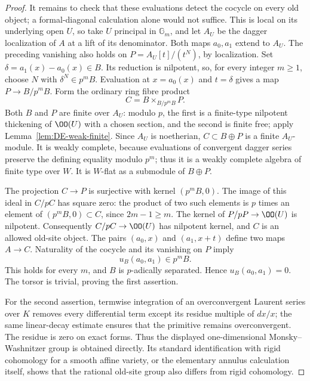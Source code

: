 \begin{proof}
It remains to check that these evaluations detect the cocycle on every old object; a formal-diagonal calculation alone would not suffice.  This is local on its underlying open $U$, so take $U$ principal in $\mathbb G_m$, and let $A_U$ be the dagger localization of $A$ at a lift of its denominator.  Both maps $a_0,a_1$ extend to $A_U$.  The preceding vanishing also holds on
$P=A_U[t]/(t^N)$, by localization.  Set $\delta=a_1(x)-a_0(x)\in B$.  Its reduction is nilpotent, so, for every integer $m\geq1$, choose $N$ with $\delta^N\in p^mB$.  Evaluation at $x=a_0(x)$ and $t=\delta$ gives a map $P\to B/p^mB$.  Form the ordinary ring fibre product
\[
                         C=B\times_{B/p^mB}P.
\]
Both $B$ and $P$ are finite over $A_U$: modulo $p$, the first is a finite-type nilpotent thickening of $\OO(U)$ with a chosen section, and the second is finite free; apply Lemma~\ref{lem:DE-weak-finite}.  Since $A_U$ is noetherian, $C\subset B\oplus P$ is a finite $A_U$-module.  It is weakly complete, because evaluations of convergent dagger series preserve the defining equality modulo $p^m$; thus it is a weakly complete algebra of finite type over $W$.  It is $W$-flat as a submodule of $B\oplus P$.

The projection $C\to P$ is surjective with kernel $(p^mB,0)$.  The image of this ideal in $C/pC$ has square zero: the product of two such elements is $p$ times an element of $(p^mB,0)\subset C$, since $2m-1\geq m$.  The kernel of $P/pP\to\OO(U)$ is nilpotent.  Consequently $C/pC\to\OO(U)$ has nilpotent kernel, and $C$ is an allowed old-site object.  The pairs $(a_0,x)$ and $(a_1,x+t)$ define two maps $A\to C$.  Naturality of the cocycle and its vanishing on $P$ imply
\[
                         u_B(a_0,a_1)\in p^mB.
\]
This holds for every $m$, and $B$ is $p$-adically separated.  Hence $u_B(a_0,a_1)=0$.  The torsor is trivial, proving the first assertion.

For the second assertion, termwise integration of an overconvergent Laurent series over $K$ removes every differential term except its residue multiple of $dx/x$; the same linear-decay estimate ensures that the primitive remains overconvergent.  The residue is zero on exact forms.  Thus the displayed one-dimensional Monsky--Washnitzer group is obtained directly.  Its standard identification with rigid cohomology for a smooth affine variety, or the elementary annulus calculation itself, shows that the rational old-site group also differs from rigid cohomology.
\end{proof}

